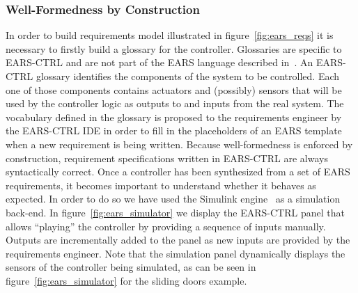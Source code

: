 \subsubsection{Well-Formedness by Construction}
In order to build requirements model illustrated in
figure~\ref{fig:ears_reqs} it is necessary to firstly build a glossary for the
controller. Glossaries are specific to \textsf{EARS-CTRL} and are not part of
the EARS language described in~\cite{EARS09}. An
\textsf{EARS-CTRL} glossary identifies the components of the system to be
controlled. Each one of those components contains actuators and (possibly)
sensors that will be used by the controller logic as outputs to and inputs from
the real system.
The vocabulary defined in the glossary is proposed to the requirements engineer
by the \textsf{EARS-CTRL} IDE in order to fill in the placeholders of an EARS
template when a new requirement is being written. Because well-formedness is
enforced by construction, requirement specifications written in
\textsf{EARS-CTRL} are always syntactically correct.
Once a controller has been synthesized from a set of EARS requirements, it
becomes important to understand whether it behaves as expected. In order to do
so we have used the Simulink engine~\cite{simulink} as a simulation back-end.
In figure~\ref{fig:ears_simulator} we display the \textsf{EARS-CTRL} panel that
allows ``playing'' the controller by providing a sequence of inputs manually.
Outputs are incrementally added to the panel as new inputs are provided by the
requirements engineer. Note that the simulation panel dynamically displays the
sensors of the controller being simulated, as can be seen in
figure~\ref{fig:ears_simulator} for the sliding doors example.
